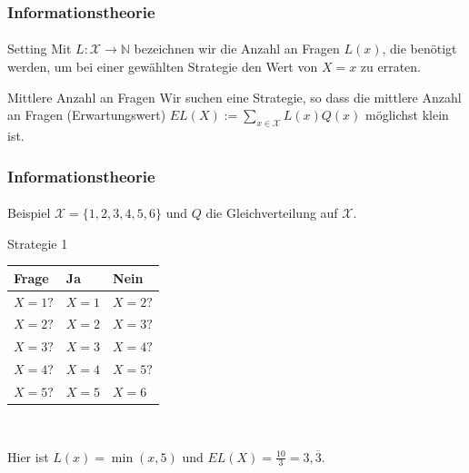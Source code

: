 \documentclass{beamer}
\begin{document}
\begin{frame}
    \frametitle{Informationstheorie}
\framesubtitle{}
\begin{block}{Setting}
Mit $L : \mathcal{X} \to \mathbb{N}$ bezeichnen wir die Anzahl an Fragen $L(x)$, die benötigt werden, um bei einer gewählten Strategie den Wert von $X = x$ zu erraten.
\end{block}

\begin{block}{Mittlere Anzahl an Fragen}
Wir suchen eine Strategie, so dass die mittlere Anzahl an Fragen  (Erwartungswert) $EL(X) := \sum_{x \in \mathcal{X}} L(x) Q(x)$  möglichst klein ist.
\end{block}

 \end{frame}


\begin{frame}
    \frametitle{Informationstheorie}
\framesubtitle{}

\begin{block}{Beispiel}
 $\mathcal{X} = \{ 1,2,3,4,5,6 \}$ und $Q$ die Gleichverteilung auf $\mathcal{X}$.
\end{block}

\begin{block}{Strategie 1}
\begin{table}[]
\begin{tabular}[h]{lll}
Frage & Ja & Nein \\
\hline
$X = 1?$ & $X = 1$ & $X = 2?$ \\
$X = 2?$ & $X = 2$ & $X = 3?$ \\
$X = 3?$ & $X = 3$ & $X = 4?$ \\
$X = 4?$ & $X = 4$ & $X = 5?$ \\
$X = 5?$ & $X = 5$ & $X = 6$ \\
\end{tabular}\\
\end{table}
Hier ist $L(x) = \min(x,5)$ und $EL(X) = \frac{10}{3} = 3,\overline{3}$.
\end{block}

 \end{frame}
\end{document}
